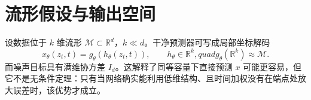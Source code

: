 \documentclass[11pt]{article}
\numberwithin{equation}{section}
\newcommand{\R}{\mathbb{R}}
\newcommand{\1}{\mathbf{1}}
\newcommand{\cM}{\mathcal{M}}
\begin{document}
\section{流形假设与输出空间}
设数据位于 $k$ 维流形 $\cM\subset\R^d$，$k\ll d$。干净预测器可写成局部坐标解码
\begin{equation}
  x_\theta(z_t,t)=g_\theta(h_\theta(z_t,t)),
  \qquad h_\theta\in\R^k,quad g_\theta(\R^k)\approx\cM.
\end{equation}
而噪声目标具有满维协方差 $I_d$。这解释了同等容量下直接预测 $x$ 可能更容易，但它不是无条件定理：只有当网络确实能利用低维结构、且时间加权没有在端点处放大误差时，该优势才成立。
\end{document}

